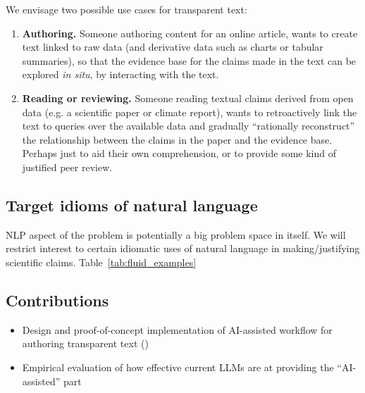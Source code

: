 We envisage two possible use cases for transparent text:

\begin{enumerate}
\item \textbf{Authoring.} Someone authoring content for an online article, wants to create text
linked to raw data (and derivative data such as charts or tabular summaries), so that the evidence base for
the claims made in the text can be explored \emph{in situ}, by interacting with the text.

\item \textbf{Reading or reviewing.} Someone reading textual claims derived from open data (e.g. a
scientific paper or climate report), wants to retroactively link the text to queries over the available data
and gradually ``rationally reconstruct'' the relationship between the claims in the paper and the evidence
base. Perhaps just to aid their own comprehension, or to provide some kind of justified peer review.
\end{enumerate}



\subsection{Target idioms of natural language}

NLP aspect of the problem is potentially a big problem space in itself. We will restrict interest to certain
idiomatic uses of natural language in making/justifying scientific claims. Table~\ref{tab:fluid_examples}



\subsection{Contributions}

\begin{itemize}
    \item Design and proof-of-concept implementation of AI-assisted workflow for authoring transparent text
    ()
    \item Empirical evaluation of how effective current LLMs are at providing the ``AI-assisted'' part
\end{itemize}
